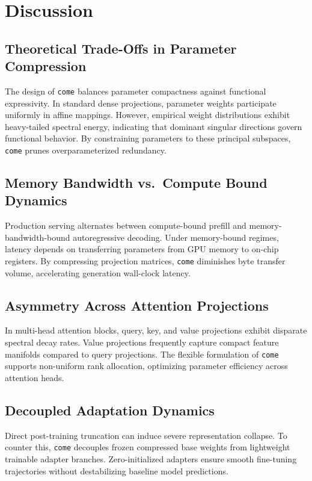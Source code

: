 \section{Discussion}

\subsection{Theoretical Trade-Offs in Parameter Compression}
The design of \texttt{come} balances parameter compactness against functional expressivity. In standard dense projections, parameter weights participate uniformly in affine mappings. However, empirical weight distributions exhibit heavy-tailed spectral energy, indicating that dominant singular directions govern functional behavior. By constraining parameters to these principal subspaces, \texttt{come} prunes overparameterized redundancy.

\subsection{Memory Bandwidth vs.\ Compute Bound Dynamics}
Production serving alternates between compute-bound prefill and memory-bandwidth-bound autoregressive decoding. Under memory-bound regimes, latency depends on transferring parameters from GPU memory to on-chip registers. By compressing projection matrices, \texttt{come} diminishes byte transfer volume, accelerating generation wall-clock latency.

\subsection{Asymmetry Across Attention Projections}
In multi-head attention blocks, query, key, and value projections exhibit disparate spectral decay rates. Value projections frequently capture compact feature manifolds compared to query projections. The flexible formulation of \texttt{come} supports non-uniform rank allocation, optimizing parameter efficiency across attention heads.

\subsection{Decoupled Adaptation Dynamics}
Direct post-training truncation can induce severe representation collapse. To counter this, \texttt{come} decouples frozen compressed base weights from lightweight trainable adapter branches. Zero-initialized adapters ensure smooth fine-tuning trajectories without destabilizing baseline model predictions.

